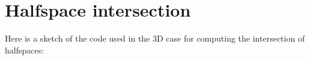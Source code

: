 \chapter{Halfspace intersection}
\label{appendix:code-intersection}

Here is a sketch of the code used in the 3D case for computing the intersection of halfspaces:



